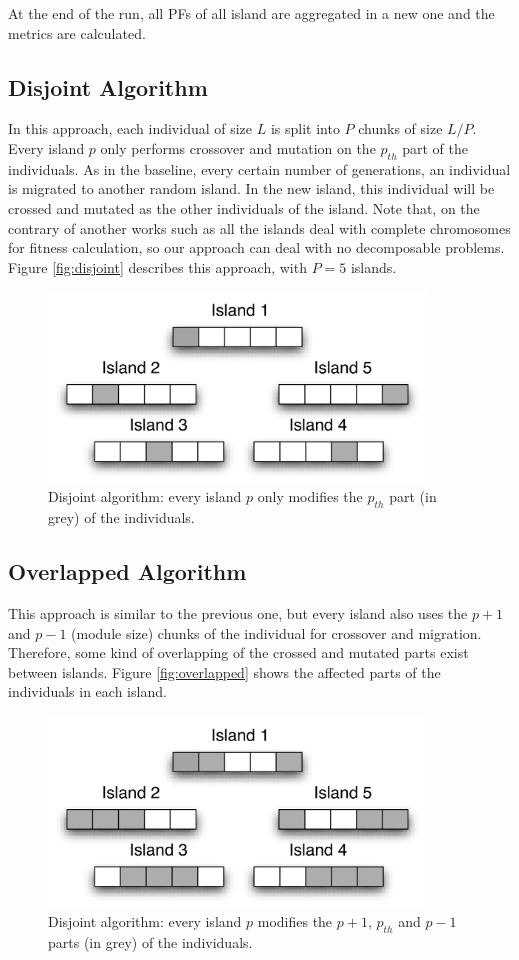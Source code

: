 \documentclass[runningheads,a4paper]{llncs}
\begin{document}
At the end of the run, all PFs of all island are aggregated in a new one and the metrics are calculated.

\subsection{Disjoint Algorithm}

In this approach, each individual of size $L$ is split into $P$ chunks of size $L/P$. Every island $p$ only performs crossover and mutation on the $p_{th}$ part of the individuals.  As in the baseline, every certain number of generations, an individual is migrated to another random island.  In the new island, this individual will be crossed and mutated as the other individuals of the island. Note that, on the contrary of another works such as \cite{EL QUE SEA} all the islands deal with complete chromosomes for fitness calculation, so our approach can deal with no decomposable problems. Figure \ref{fig:disjoint} describes this approach, with $P=5$ islands.

\begin{figure}
\includegraphics[width=10cm]{islandDisjoint.jpg}
\caption{Disjoint algorithm: every island $p$ only modifies the $p_{th}$ part (in grey) of the individuals.}
\end{figure}

\subsection{Overlapped Algorithm}
This approach is similar to the previous one, but every island also uses the $p+1$ and $p-1$ (module size) chunks of the individual for crossover and migration. Therefore, some kind of overlapping of the crossed and mutated parts exist between islands. Figure \ref{fig:overlapped} shows the affected parts of the individuals in each island.

 
\begin{figure}
\includegraphics[width=10cm]{islandNoDisjoint.jpg}
\caption{Disjoint algorithm: every island $p$ modifies the  $p+1$, $p_{th}$ and $p-1$  parts (in grey) of the individuals.}
\end{figure}
\end{document}
